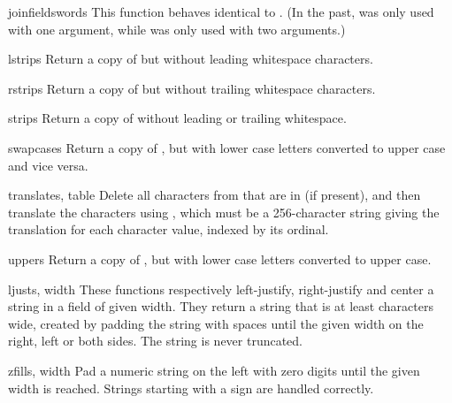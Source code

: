 \begin{funcdesc}{joinfields}{words}
  This function behaves identical to .  (In the past, 
   was only used with one argument, while
   was only used with two arguments.)
\end{funcdesc}

\begin{funcdesc}{lstrip}{s}
  Return a copy of  but without leading whitespace characters.
\end{funcdesc}

\begin{funcdesc}{rstrip}{s}
  Return a copy of  but without trailing whitespace
  characters.
\end{funcdesc}

\begin{funcdesc}{strip}{s}
  Return a copy of  without leading or trailing whitespace.
\end{funcdesc}

\begin{funcdesc}{swapcase}{s}
  Return a copy of , but with lower case letters
  converted to upper case and vice versa.
\end{funcdesc}

\begin{funcdesc}{translate}{s, table}
  Delete all characters from  that are in  (if 
  present), and then translate the characters using , which 
  must be a 256-character string giving the translation for each
  character value, indexed by its ordinal.  
\end{funcdesc}

\begin{funcdesc}{upper}{s}
  Return a copy of , but with lower case letters converted to
  upper case.
\end{funcdesc}

\begin{funcdesc}{ljust}{s, width}
  These functions respectively left-justify, right-justify and center
  a string in a field of given width.  They return a string that is at
  least  characters wide, created by padding the string
   with spaces until the given width on the right, left or both
  sides.  The string is never truncated.
\end{funcdesc}

\begin{funcdesc}{zfill}{s, width}
  Pad a numeric string on the left with zero digits until the given
  width is reached.  Strings starting with a sign are handled
  correctly.
\end{funcdesc}

